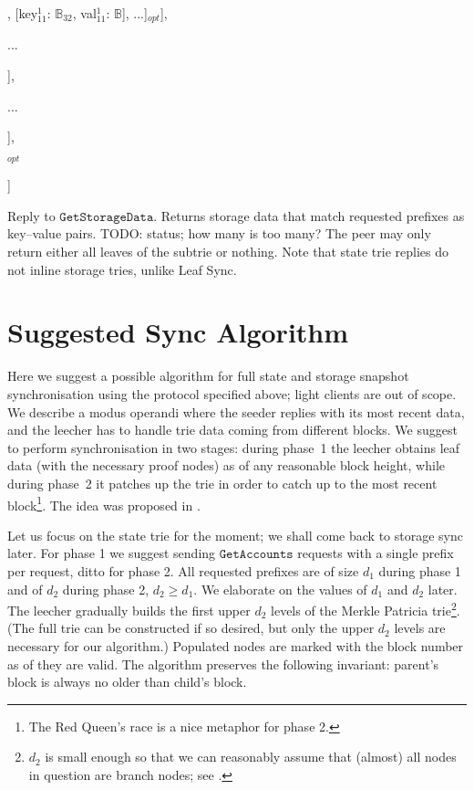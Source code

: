 \documentclass{amsart}
\begin{document}
\quad \qquad [status$^1_1$: $\mathbb{N}$, [[key$^1_{10}$: $\mathbb{B}_{32}$, val$^1_{10}$: $\mathbb{B}$], [key$^1_{11}$: $\mathbb{B}_{32}$, val$^1_{11}$: $\mathbb{B}$], ...]$_{opt}$],

\quad \qquad ...

\qquad ],

\qquad ...

\quad ],

$_{opt}$

]
\medskip

Reply to $\texttt{GetStorageData}$.
Returns storage data that match requested prefixes as key--value pairs.
TODO: status; how many is too many?
The peer may only return either all leaves of the subtrie or nothing.
Note that state trie replies do not inline storage tries, unlike Leaf Sync.

\section{Suggested Sync Algorithm}

Here we suggest a possible algorithm for full state and storage snapshot synchronisation using the protocol specified above;
light clients are out of scope.
We describe a modus operandi where the seeder replies with its most recent data,
and the leecher has to handle trie data coming from different blocks.
We suggest to perform synchronisation in two stages:
during phase~1 the leecher obtains leaf data (with the necessary proof nodes) as of any reasonable block height,
while during phase~2 it patches up the trie in order to catch up to the most recent block\footnote{The
Red Queen's race is a nice metaphor for phase 2.}.
The idea was proposed in \cite{leaf_sync}.

Let us focus on the state trie for the moment; we shall come back to storage sync later.
For phase 1 we suggest sending $\texttt{GetAccounts}$ requests with a single prefix per request, ditto for phase 2.
All requested prefixes are of size $d_1$ during phase 1 and of $d_2$ during phase 2, $d_2 \geq d_1$.
We elaborate on the values of $d_1$ and $d_2$ later.
The leecher gradually builds the first upper $d_2$ levels of the Merkle Patricia trie\footnote{$d_2$
is small enough so that we can reasonably assume that (almost) all nodes in question are branch nodes;
see \cite{akhunov_1x_workshop_part2}.}.
(The full trie can be constructed if so desired, but only the upper $d_2$ levels are necessary for our algorithm.)
Populated nodes are marked with the block number as of they are valid.
The algorithm preserves the following invariant: parent's block is always no older than child's block.
\end{document}
